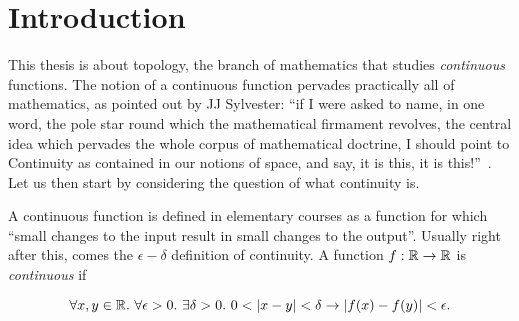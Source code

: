 \chapter{Introduction}

This thesis is about topology, the branch of mathematics that studies \emph{continuous}
functions. The notion of a continuous function pervades practically all of mathematics, as
pointed out by JJ Sylvester: ``if I were asked to name, in one word, the pole star round
which the mathematical firmament revolves, the central idea which pervades the whole
corpus of mathematical doctrine, I should point to Continuity as contained in our notions
of space, and say, it is this, it is this!''~\cite[pg. 27]{armstrong_basic_2011}. Let us
then start by considering the question of what continuity is.

A continuous function is defined in elementary courses as a function for which ``small
changes to the input result in small changes to the output''. Usually right after this,
comes the $\epsilon-\delta$ definition of continuity. A function $f : \mathbb{R}{} \rightarrow \mathbb{R}{}$ is
\emph{continuous} if

\begin{equation*}
  \forall x, y \in \mathbb{R}{}.\ \forall \epsilon > 0.\ \exists \delta > 0.\ 0 < | x - y | < \delta \rightarrow | f(x) - f(y) | < \epsilon.
\end{equation*}
